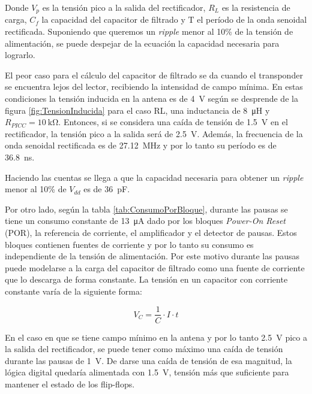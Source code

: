 Donde \(V_{p}\) es la tensión pico a la salida del rectificador, 
\(R_{L}\) es la resistencia de carga, \(C_{f}\) la capacidad del 
capacitor de filtrado y \(\mathrm{T}\) el período de la onda 
senoidal rectificada. Suponiendo que queremos un \emph{ripple} menor 
al 10\% de la tensión de alimentación, se puede despejar de la 
ecuación la capacidad necesaria para lograrlo.

El peor caso para el cálculo del capacitor de filtrado se da 
cuando el transponder se encuentra lejos del lector, recibiendo la 
intensidad de campo mínima. En estas condiciones la tensión inducida 
en la antena es de \SI{4}{\volt} según se desprende de la figura 
\ref {fig:TensionInducida} para el caso RL, una inductancia de 
\SI{8}{\micro\henry} y \(R_{PICC}=\SI{10}{\kilo\ohm}\). Entonces, si 
se considera una caída de tensión de \SI{1.5}{\volt} en el 
rectificador, la tensión pico a la salida será de \SI{2.5}{\volt}. 
Además, la frecuencia de la onda senoidal rectificada es de 
\SI{27.12}{\mega\hertz} y por lo tanto su período es de 
\SI{36.8}{\nano\second}.

Haciendo las cuentas se llega a que la capacidad necesaria para 
obtener un \emph{ripple} menor al 10\% de \(V_{dd}\) es de 
\SI{36}{\pico\farad}.

\bigskip
Por otro lado, según la tabla \ref{tab:ConsumoPorBloque}, durante 
las pausas se tiene un consumo constante de \SI{13}{\micro\ampere} 
dado por los bloques \emph{Power-On Reset} (POR), la referencia de 
corriente, el amplificador y el detector de pausas. Estos bloques 
contienen fuentes de corriente y por lo tanto su consumo
es independiente de la tensión de alimentación. Por este motivo 
durante las pausas puede modelarse a la carga del capacitor de 
filtrado como una fuente de corriente que lo descarga de forma 
constante. La tensión en un capacitor con corriente constante varía 
de la siguiente forma:

\begin{equation}\label{eq:VcapConCorriente}
	V_{C} = \frac{1}{C} \cdot I \cdot t
\end{equation}

En el caso en que se tiene campo mínimo en la antena y por lo tanto 
\SI{2.5}{\volt} pico a la salida del rectificador, se puede tener como 
máximo una caída de tensión durante las pausas de \SI{1}{\volt}. De 
darse una caída de tensión de esa magnitud, la lógica 
digital quedaría alimentada con \SI{1.5}{\volt}, tensión más que 
suficiente para mantener el estado de los flip-flops.

